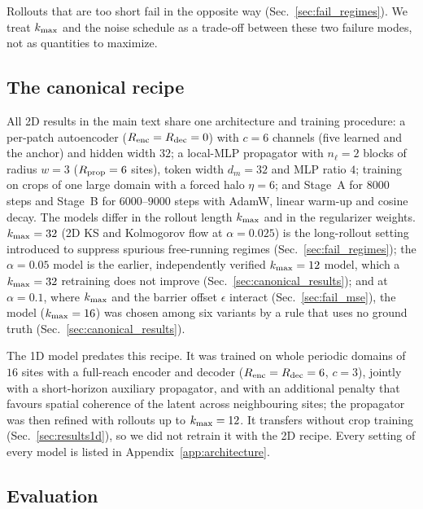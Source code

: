 Rollouts that are too short fail in the opposite way
(Sec.~\ref{sec:fail_regimes}). We treat $k_{\max}$ and the noise schedule as
a trade-off between these two failure modes, not as quantities to
maximize.

\subsection{The canonical recipe}
\label{sec:canonical_recipe}

All 2D results in the main text share one architecture and training
procedure: a per-patch autoencoder ($R_{\mathrm{enc}}=R_{\mathrm{dec}}=0$) with $c=6$ channels
(five learned and the anchor) and hidden width $32$; a local-MLP
propagator with $n_\ell=2$ blocks of radius $w=3$ ($R_{\mathrm{prop}}=6$ sites),
token width $d_m=32$ and MLP ratio $4$; training on crops of one large
domain with a forced halo $\eta=6$; and Stage~A for $8000$ steps and
Stage~B for $6000$--$9000$ steps with AdamW, linear warm-up and cosine
decay. The models differ in the rollout length $k_{\max}$ and in the
regularizer weights. $k_{\max}=32$ (2D KS and Kolmogorov flow at
$\alpha=0.025$) is the long-rollout setting introduced to suppress
spurious free-running regimes (Sec.~\ref{sec:fail_regimes}); the
$\alpha=0.05$ model is the earlier, independently verified $k_{\max}=12$
model, which a $k_{\max}=32$ retraining does not improve
(Sec.~\ref{sec:canonical_results}); and at $\alpha=0.1$, where $k_{\max}$ and
the barrier offset $\epsilon$ interact (Sec.~\ref{sec:fail_mse}), the
model ($k_{\max}=16$) was chosen among six variants by a rule that uses no
ground truth (Sec.~\ref{sec:canonical_results}).

The 1D model predates this recipe. It was trained on whole periodic
domains of $16$ sites with a full-reach encoder and decoder
($R_{\mathrm{enc}}=R_{\mathrm{dec}}=6$, $c=3$), jointly with a short-horizon auxiliary
propagator, and with an additional penalty that favours spatial
coherence of the latent across neighbouring sites; the propagator was
then refined with rollouts up to $k_{\max}=12$. It transfers without crop
training (Sec.~\ref{sec:results1d}), so we did not retrain it with the 2D
recipe. Every setting of every model is listed in
Appendix~\ref{app:architecture}.

\subsection{Evaluation}
\label{sec:evaluation}

